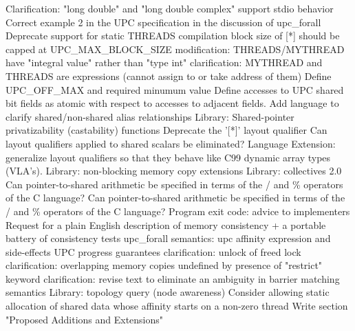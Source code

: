 {      \or %
        Clarification: "long double" and "long double complex" support
      \or %
        stdio behavior
      \or %
        Correct example 2 in the UPC specification in the discussion of upc\_forall
      \or %
        Deprecate support for static THREADS compilation
      \or %
        block size of [*] should be capped at UPC\_MAX\_BLOCK\_SIZE
      \or %
        modification: THREADS/MYTHREAD have "integral value" rather than "type int"
      \or %
        clarification: MYTHREAD and THREADS are expressions (cannot assign to or take address of them)
      \or %
        Define UPC\_OFF\_MAX and required minumum value
      \or %
        Define accesses to UPC shared bit fields as atomic with respect to accesses to adjacent fields.
      \or %
        Add language to clarify shared/non-shared alias relationships
      \or %
        Library: Shared-pointer privatizability (castability) functions
      \or %
        Deprecate the '[*]' layout qualifier
      \or %
        Can layout qualifiers applied to shared scalars be eliminated?
      \or %
        Language Extension:  generalize layout qualifiers so that they behave like C99 dynamic array types (VLA's).
      \or %
        Library: non-blocking memory copy extensions
      \or %
        Library: collectives 2.0
      \or %
        Can pointer-to-shared arithmetic be specified in terms of the / and \% operators of the C language?
      \or %
        Can pointer-to-shared arithmetic be specified in terms of the / and \% operators of the C language?
      \or %
        Program exit code: advice to implementers
      \or %
        Request for a plain English description of memory consistency + a portable battery of consistency tests
      \or %
        upc\_forall semantics: upc affinity expression and side-effects
      \or %
        UPC progress guarantees
      \or %
        clarification: unlock of freed lock
      \or %
        clarification: overlapping memory copies undefined by presence of "restrict" keyword
      \or %
        clarification: revise text to eliminate an ambiguity in barrier matching semantics
      \or %
        Library: topology query (node awareness)
      \or %
        Consider allowing static allocation of shared data whose affinity starts on a non-zero thread
      \or %
        Write section "Proposed Additions and Extensions"
}
